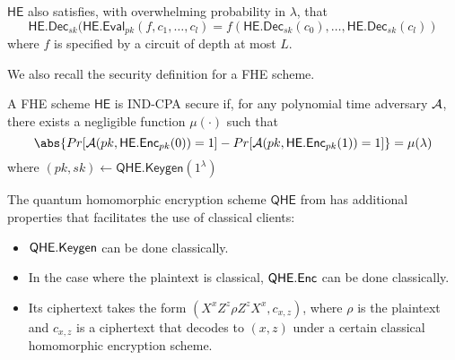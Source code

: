 $\mathsf{HE}$ also satisfies, with overwhelming probability in $\lambda$, that
$$\mathsf{HE.Dec}_{sk}(\mathsf{HE.Eval}_{pk}(f, c_1, \ldots, c_l)=f(\mathsf{HE.Dec}_{sk}(c_0),\ldots,\mathsf{HE.Dec}_{sk}(c_l))$$
where $f$ is specified by a circuit of depth at most $L$.


We also recall the security definition for a FHE scheme.

\begin{dfn}
	A FHE scheme $\mathsf{HE}$ is IND-CPA secure if, for any polynomial time adversary $\mathcal{A}$, there exists a negligible function $\mu(\cdot)$ such that
	$$\abs{Pr[\cA(pk, \mathsf{HE.Enc}_{pk}(0))=1]-Pr[\cA(pk, \mathsf{HE.Enc}_{pk}(1))=1]}=\mu(\lambda)$$
	where $(pk, sk)\leftarrow\mathsf{QHE.Keygen}(1^\lambda)$
\end{dfn}

The quantum homomorphic encryption scheme $\mathsf{QHE}$ from \cite{mahadev_qfhe} has additional properties that facilitates the use of classical clients:
\begin{itemize}
	\item $\mathsf{QHE.Keygen}$ can be done classically.
	\item In the case where the plaintext is classical, $\mathsf{QHE.Enc}$ can be done classically.
	\item Its ciphertext takes the form $(X^xZ^z\rho Z^zX^x, c_{x, z})$, where $\rho$ is the plaintext and $c_{x, z}$ is a ciphertext that decodes to $(x, z)$ under a certain classical homomorphic encryption scheme.
\end{itemize}
